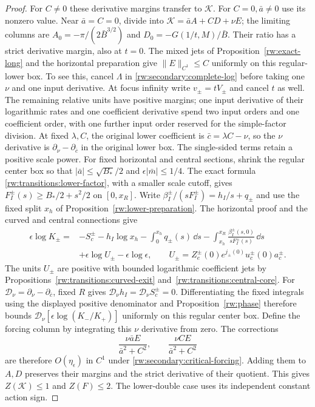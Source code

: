 \begin{proof}
For $C\ne0$ these derivative margins transfer to $\mathcal K$.
For $C=0,\bar a\ne0$ use its nonzero value.
Near $\bar a=C=0$, divide into
$\mathcal K=\bar a A+CD+\nu E$; the limiting columns are
$A_0=-\pi/(2\bar B^{3/2})$ and
$D_0=-G(1/t,M)/\bar B$.
Their ratio has a strict derivative margin, also at $t=0$.
The mixed jets of Proposition~\ref{rw:exact-long} and the horizontal
preparation give $\|E\|_{C^1}\le C$ uniformly on this regular-lower
box. To see this, cancel $\Lambda$ in
\eqref{rw:secondary:complete-log} before taking one $\nu$ and one
input derivative. At focus infinity write $v_\pm=tV_\pm$ and cancel
$t$ as well. The remaining relative units have positive margins;
one input derivative of their logarithmic rates and one coefficient
derivative spend two input orders and one coefficient order, with
one further input order reserved for the simple-factor division.
At fixed $\lambda,C$, the original lower coefficient is
$\bar c=\lambda C-\nu$, so the $\nu$ derivative is
$\partial_\nu-\partial_{\bar c}$ in the original lower box.
The single-sided terms retain a positive scale power.
For fixed horizontal and central sections, shrink the regular center box
so that $|\bar a|\le\sqrt{B_*}/2$ and $\epsilon|\bar m|\le1/4$.
The exact formula \eqref{rw:transitions:lower-factor}, with a smaller
scale cutoff, gives $F_I^\pm(s)\ge B_*/2+s^2/2$ on $[0,x_R]$.
Write $\beta_I^\pm/(sF_I^\pm)=h_I/s+q_\pm$ and use the fixed
split $x_h$ of Proposition~\ref{rw:lower-preparation}. The horizontal
proof and the curved and central connections give
\[
\begin{aligned}
 \epsilon\log K_\pm={}&-S_c^\pm-h_I\log x_h
 -\int_0^{x_h}q_\pm(s)\,\dd s
 -\int_{x_h}^{x_R}\frac{\beta_I^\pm(s,0)}{sF_I^\pm(s)}\,\dd s\\
 &+\epsilon\log U_\pm-\epsilon\log\epsilon,
 \qquad U_\pm=Z_e^\pm(0)e^{j_\pm(0)}u_c^\pm(0)a_c^\pm.
\end{aligned}
\]
The units $U_\pm$ are positive with bounded logarithmic coefficient
jets by Propositions~\ref{rw:transitions:curved-exit}
and~\ref{rw:transitions:central-core}. For
$\mathscr D_\nu=\partial_\nu-\partial_{\bar c}$, fixed $R$ gives
$\mathscr D_\nu h_I=\mathscr D_\nu S_c^\pm=0$.
Differentiating the fixed integrals using the displayed positive
denominator and Proposition~\ref{rw:phase} therefore bounds
$\mathscr D_\nu[\epsilon\log(K_-/K_+)]$ uniformly on this regular
center box. Define the forcing column by integrating this
$\nu$ derivative from zero. The corrections
\[
 \frac{\nu\bar a E}{\bar a^2+C^2},\qquad
 \frac{\nu C E}{\bar a^2+C^2}
\]
are therefore $O(\eta_\epsilon)$ in $C^1$ under
\eqref{rw:secondary:critical-forcing}. Adding them to $A,D$
preserves their margins and the strict derivative of their quotient.
This gives $Z(\mathcal K)\le1$ and $Z(F)\le2$.
The lower-double case uses its independent constant action sign.
\end{proof}

